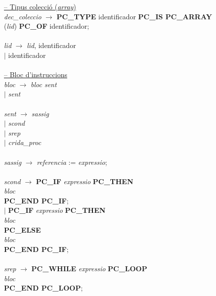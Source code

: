 \begin{tabbing}
        \underline{-- Tipus colecció (\textit{array})} \\
        \textit{dec\_coleccio} \> $\rightarrow$ \> \textbf{PC\_TYPE} identificador \textbf{PC\_IS PC\_ARRAY} \\
		\> (\textit{lid}) \textbf{PC\_OF} identificador; \\
        \\
        \textit{lid} \> $\rightarrow$ \> \textit{lid}, identificador \\
        \> $\mid$ \> identificador \\
        \\
        
        
        \underline{-- Bloc d'instruccions} \\
        \textit{bloc} \> $\rightarrow$ \> \textit{bloc sent} \\
        \> $\mid$ \> \textit{sent} \\
        \\
        \textit{sent} \> $\rightarrow$ \> \textit{sassig} \\
        \> $\mid$ \> \textit{scond} \\
        \> $\mid$ \> \textit{srep} \\
        \> $\mid$ \> \textit{crida\_proc} \\
        \\
        
        \textit{sassig} \> $\rightarrow$ \> \textit{referencia} := \textit{expressio}; \\
        \\
        
        \textit{scond} \> $\rightarrow$ \> \textbf{PC\_IF} \textit{expressio} \textbf{PC\_THEN} \\
        \> \> \>  \textit{bloc} \\
        \> \> \textbf{PC\_END PC\_IF}; \\
        \> $\mid$ \> \textbf{PC\_IF} \textit{expressio} \textbf{PC\_THEN} \\
        \> \> \> \textit{bloc} \\
        \> \> \textbf{PC\_ELSE} \\
        \> \> \> \textit{bloc} \\
        \> \> \textbf{PC\_END PC\_IF}; \\
        \\
        
        \textit{srep} \> $\rightarrow$ \> \textbf{PC\_WHILE} \textit{expressio} \textbf{PC\_LOOP} \\
        \> \> \> \textit{bloc} \\
        \> \> \textbf{PC\_END PC\_LOOP}; \\
        \\
        

\end{tabbing}
